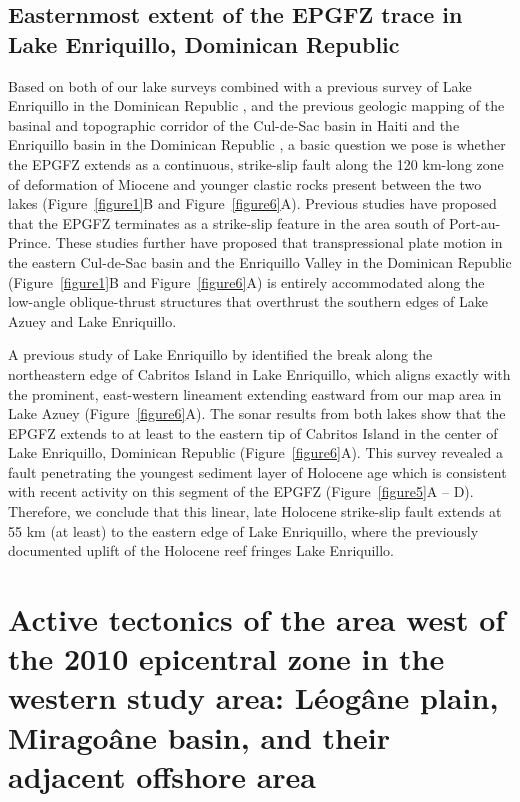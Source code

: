 \documentclass[linenumbers,draft]{agujournal}
\begin{document}
\subsection{Easternmost extent of the EPGFZ trace in Lake Enriquillo, Dominican Republic}
Based on both of our lake surveys combined with a previous survey of Lake Enriquillo in the Dominican Republic \citep{rios2013holocene}, and the previous geologic mapping of the basinal and topographic corridor of the Cul-de-Sac basin in Haiti and the Enriquillo basin in the Dominican Republic \citep{mann1995actively,mann1999caribbean}, a basic question we pose is whether the EPGFZ extends as a continuous, strike-slip fault along the 120 km-long zone of deformation of Miocene and younger clastic rocks present between the two lakes (Figure~\ref{figure1}B and Figure~\ref{figure6}A). Previous studies \citep{saint2015seismotectonics,symithe2016present} have proposed that the EPGFZ terminates as a strike-slip feature in the area south of Port-au-Prince. These studies further have proposed that transpressional plate motion in the eastern Cul-de-Sac basin and the Enriquillo Valley in the Dominican Republic (Figure~\ref{figure1}B and Figure~\ref{figure6}A) is entirely accommodated along the low-angle oblique-thrust structures that overthrust the southern edges of Lake Azuey and Lake Enriquillo. 

A previous study of Lake Enriquillo by \citet{rios2013holocene} identified the break along the northeastern edge of Cabritos Island in Lake Enriquillo, which aligns exactly with the prominent, east-western lineament extending eastward from our map area in Lake Azuey (Figure~\ref{figure6}A). The sonar results from both lakes show that the EPGFZ extends to at least to the eastern tip of Cabritos Island in the center of Lake Enriquillo, Dominican Republic (Figure~\ref{figure6}A). This survey revealed a fault penetrating the youngest sediment layer of Holocene age which is consistent with recent activity on this segment of the EPGFZ (Figure~\ref{figure5}A -- D). Therefore, we conclude that this linear, late Holocene strike-slip fault extends at 55 km (at least) to the eastern edge of Lake Enriquillo, where the previously documented \citep{mann1995actively} uplift of the Holocene reef fringes Lake Enriquillo.

\section{Active tectonics of the area west of the 2010 epicentral zone in the western study area: L\'eog\^ane plain, Mirago\^ane basin, and their adjacent offshore area}
\end{document}
